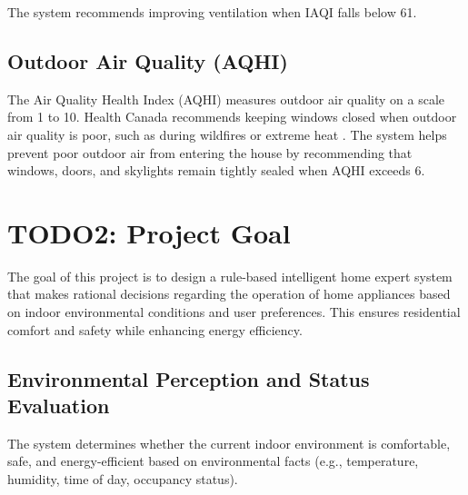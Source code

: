 \documentclass{article}
\begin{document}
The system recommends improving ventilation when IAQI falls below 61.

\subsection{Outdoor Air Quality (AQHI)}

The Air Quality Health Index (AQHI) measures outdoor air quality on a scale from 1 to 10. Health Canada recommends keeping windows closed when outdoor air quality is poor, such as during wildfires or extreme heat \cite{health_canada_home}. The system helps prevent poor outdoor air from entering the house by recommending that windows, doors, and skylights remain tightly sealed when AQHI exceeds 6.




\section{TODO2: Project Goal}

The goal of this project is to design a rule-based intelligent home expert system that makes rational decisions regarding the operation of home appliances based on indoor environmental conditions and user preferences. This ensures residential comfort and safety while enhancing energy efficiency.

\subsection{Environmental Perception and Status Evaluation}

The system determines whether the current indoor environment is comfortable, safe, and energy-efficient based on environmental facts (e.g., temperature, humidity, time of day, occupancy status).
\end{document}
